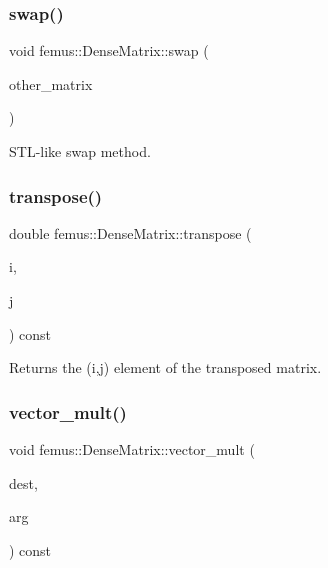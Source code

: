 \subsubsection{\texorpdfstring{swap()}{swap()}}
{\footnotesize\ttfamily void femus\+::\+Dense\+Matrix\+::swap (\begin{DoxyParamCaption}\item[{\mbox{\hyperlink{classfemus_1_1_dense_matrix}{Dense\+Matrix}} \&}]{other\+\_\+matrix }\end{DoxyParamCaption})\hspace{0.3cm}{\ttfamily [inline]}}



S\+T\+L-\/like swap method. 

\mbox{\label{classfemus_1_1_dense_matrix_a66f15cb283425507fcf2883394d18086}} 
\subsubsection{\texorpdfstring{transpose()}{transpose()}}
{\footnotesize\ttfamily double femus\+::\+Dense\+Matrix\+::transpose (\begin{DoxyParamCaption}\item[{const int}]{i,  }\item[{const int}]{j }\end{DoxyParamCaption}) const\hspace{0.3cm}{\ttfamily [inline]}}

\begin{DoxyReturn}{Returns}
the {\ttfamily }(i,j) element of the transposed matrix. 
\end{DoxyReturn}
\mbox{\label{classfemus_1_1_dense_matrix_abbedc871f6bb0adebf1889a6ca8dbc85}} 
\subsubsection{\texorpdfstring{vector\+\_\+mult()}{vector\_mult()}}
{\footnotesize\ttfamily void femus\+::\+Dense\+Matrix\+::vector\+\_\+mult (\begin{DoxyParamCaption}\item[{\mbox{\hyperlink{classfemus_1_1_dense_vector}{Dense\+Vector}} \&}]{dest,  }\item[{const \mbox{\hyperlink{classfemus_1_1_dense_vector}{Dense\+Vector}} \&}]{arg }\end{DoxyParamCaption}) const}



